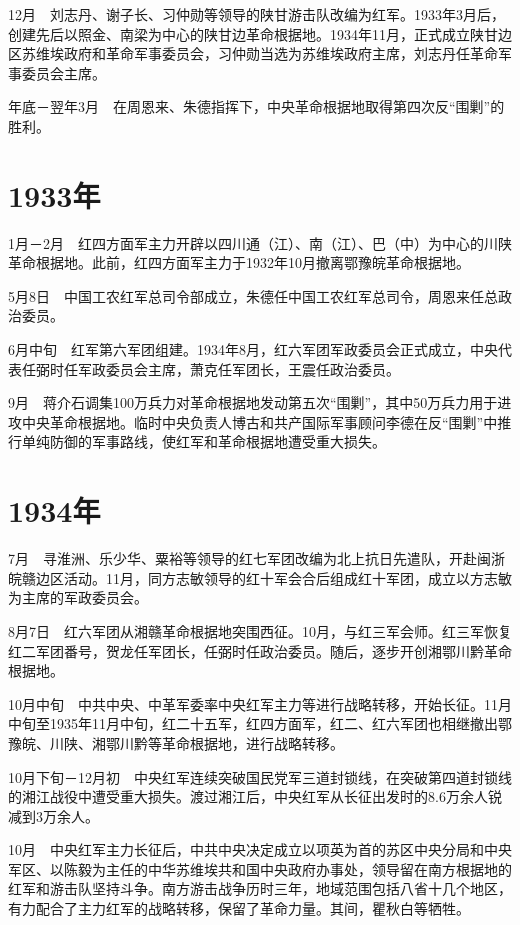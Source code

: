 \documentclass[10pt,a4paper,twocolumn]{book}
\begin{document}
12月　刘志丹、谢子长、习仲勋等领导的陕甘游击队改编为红军。1933年3月后，创建先后以照金、南梁为中心的陕甘边革命根据地。1934年11月，正式成立陕甘边区苏维埃政府和革命军事委员会，习仲勋当选为苏维埃政府主席，刘志丹任革命军事委员会主席。

年底－翌年3月　在周恩来、朱德指挥下，中央革命根据地取得第四次反“围剿”的胜利。

\section{1933年}

1月－2月　红四方面军主力开辟以四川通（江）、南（江）、巴（中）为中心的川陕革命根据地。此前，红四方面军主力于1932年10月撤离鄂豫皖革命根据地。

5月8日　中国工农红军总司令部成立，朱德任中国工农红军总司令，周恩来任总政治委员。

6月中旬　红军第六军团组建。1934年8月，红六军团军政委员会正式成立，中央代表任弼时任军政委员会主席，萧克任军团长，王震任政治委员。

9月　蒋介石调集100万兵力对革命根据地发动第五次“围剿”，其中50万兵力用于进攻中央革命根据地。临时中央负责人博古和共产国际军事顾问李德在反“围剿”中推行单纯防御的军事路线，使红军和革命根据地遭受重大损失。

\section{1934年}

7月　寻淮洲、乐少华、粟裕等领导的红七军团改编为北上抗日先遣队，开赴闽浙皖赣边区活动。11月，同方志敏领导的红十军会合后组成红十军团，成立以方志敏为主席的军政委员会。

8月7日　红六军团从湘赣革命根据地突围西征。10月，与红三军会师。红三军恢复红二军团番号，贺龙任军团长，任弼时任政治委员。随后，逐步开创湘鄂川黔革命根据地。

10月中旬　中共中央、中革军委率中央红军主力等进行战略转移，开始长征。11月中旬至1935年11月中旬，红二十五军，红四方面军，红二、红六军团也相继撤出鄂豫皖、川陕、湘鄂川黔等革命根据地，进行战略转移。

10月下旬－12月初　中央红军连续突破国民党军三道封锁线，在突破第四道封锁线的湘江战役中遭受重大损失。渡过湘江后，中央红军从长征出发时的8.6万余人锐减到3万余人。

10月　中央红军主力长征后，中共中央决定成立以项英为首的苏区中央分局和中央军区、以陈毅为主任的中华苏维埃共和国中央政府办事处，领导留在南方根据地的红军和游击队坚持斗争。南方游击战争历时三年，地域范围包括八省十几个地区，有力配合了主力红军的战略转移，保留了革命力量。其间，瞿秋白等牺牲。
\end{document}
